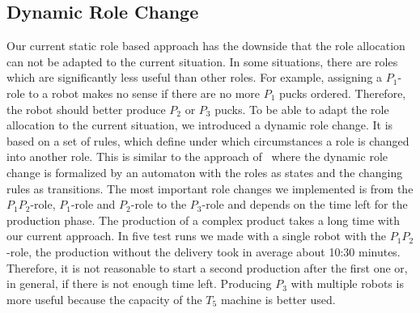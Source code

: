 \subsection{Dynamic Role Change}
Our current static role based approach has the downside that the role allocation can not be adapted to the current situation. In some situations, there are roles which are significantly less useful than other roles. For example, assigning a $P_1$-role to a robot makes no sense if there are no more $P_1$ pucks ordered. Therefore, the robot should better produce $P_2$ or $P_3$ pucks. To be able to adapt the role allocation to the current situation, we introduced a dynamic role change. It is based on a set of rules, which define under which circumstances a role is changed into another role. This is similar to the approach of~\cite{dynamic_role_assignment} where the dynamic role change is formalized by an automaton with the roles as states and the changing rules as transitions. The most important role changes we implemented is from the $P_1P_2$-role, $P_1$-role and $P_2$-role to the $P_3$-role and depends on the time left for the production phase. The production of a complex product takes a long time with our current approach. In five test runs we made with a single robot with the $P_1P_2$-role, the production without the delivery took in average about 10:30 minutes. Therefore, it is not reasonable to start a second production after the first one or, in general, if there is not enough time left. Producing $P_3$ with multiple robots is more useful because the capacity of the $T_5$ machine is better used.

